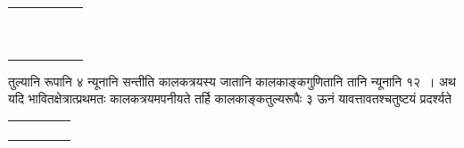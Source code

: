 \documentclass[11pt, openany]{book}
\begin{document}
\begin{flushright}
\begin{minipage}[c]{0.3\textwidth}
\vspace{2mm}
\renewcommand{\arraystretch}{0.8}
\begin{tabular}{l|llllp{1cm}|}
\cline{2-6}
                          & \multicolumn{1}{l|}{} & \multicolumn{1}{l|}{} & \multicolumn{1}{l|}{} & \multicolumn{1}{l|}{} &  \\
                          & \multicolumn{1}{l|}{} & \multicolumn{1}{l|}{} & \multicolumn{1}{l|}{} & \multicolumn{1}{l|}{} &  \\
                          & \multicolumn{1}{l|}{} & \multicolumn{1}{l|}{} & \multicolumn{1}{l|}{} & \multicolumn{1}{l|}{} &  \\
                          & \multicolumn{1}{l|}{} & \multicolumn{1}{l|}{} & \multicolumn{1}{l|}{} & \multicolumn{1}{l|}{} &  \\
                          & \multicolumn{1}{l|}{} & \multicolumn{1}{l|}{} & \multicolumn{1}{l|}{} & \multicolumn{1}{l|}{} &  \\
                          & \multicolumn{1}{l|}{} & \multicolumn{1}{l|}{} & \multicolumn{1}{l|}{} & \multicolumn{1}{l|}{} &  \\
                          & \multicolumn{1}{l|}{} & \multicolumn{1}{l|}{} & \multicolumn{1}{l|}{} & \multicolumn{1}{l|}{} &  \\ \cline{2-6} 
                          &                       &                       &                       &                       &  \\ \cline{2-6} 
 &                       &                       &                       &                       &  \\ \cline{2-6} 
                          &                       &                       &                       &                       &  \\ \cline{2-6} 
                          &                       &                       &                       &                       &  \\ \cline{2-6} 
\end{tabular}
\end{minipage} 
\hfill
\begin{minipage}{0.61\textwidth} 
\noindent तुल्यानि रूपानि ४  न्यूनानि सन्तीति कालकत्रयस्य जातानि कालकाङ्कगुणितानि तानि न्यूनानि १२~। अथ यदि भावितक्षेत्रात्प्रथमतः कालकत्रयमपनीयते तर्हि कालकाङ्कतुल्यरूपैः ३ ऊनं यावत्तावतश्चतुष्टयं प्रदर्श्यते

\renewcommand{\arraystretch}{0.8}
\begin{center}
\begin{tabular}{|l|l|l|l|p{2cm}|}
\hline
 &  &  &  &  \\ \hline
 &  &  &  &  \\ \hline
 &  &  &  &  \\ \hline
 &  &  &  &  \\ 
 &  &  &  &  \\ \hline
\end{tabular}
\end{center}
\end{minipage} 
\end{flushright}
\end{document}
